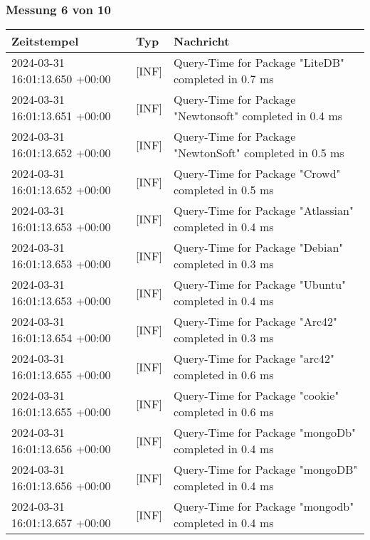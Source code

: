     \subsubsection*{Messung 6 von 10} \label{subsubsec:MySQLMitIndex6von10}
        {
            {\small
                \begin{tabularx}{\textwidth}{|l|l|X|}
                    \hline
                    \textbf{Zeitstempel} & \textbf{Typ} & \textbf{Nachricht} \\
                    \hline
                    \endhead
                    2024-03-31 16:01:13.650 +00:00 & [INF] & Query-Time for Package "LiteDB" completed in 0.7 ms \\
                    2024-03-31 16:01:13.651 +00:00 & [INF] & Query-Time for Package "Newtonsoft" completed in 0.4 ms \\
                    2024-03-31 16:01:13.652 +00:00 & [INF] & Query-Time for Package "NewtonSoft" completed in 0.5 ms \\
                    2024-03-31 16:01:13.652 +00:00 & [INF] & Query-Time for Package "Crowd" completed in 0.5 ms \\
                    2024-03-31 16:01:13.653 +00:00 & [INF] & Query-Time for Package "Atlassian" completed in 0.4 ms \\
                    2024-03-31 16:01:13.653 +00:00 & [INF] & Query-Time for Package "Debian" completed in 0.3 ms \\
                    2024-03-31 16:01:13.653 +00:00 & [INF] & Query-Time for Package "Ubuntu" completed in 0.4 ms \\
                    2024-03-31 16:01:13.654 +00:00 & [INF] & Query-Time for Package "Arc42" completed in 0.3 ms \\
                    2024-03-31 16:01:13.655 +00:00 & [INF] & Query-Time for Package "arc42" completed in 0.6 ms \\
                    2024-03-31 16:01:13.655 +00:00 & [INF] & Query-Time for Package "cookie" completed in 0.6 ms \\
                    2024-03-31 16:01:13.656 +00:00 & [INF] & Query-Time for Package "mongoDb" completed in 0.4 ms \\
                    2024-03-31 16:01:13.656 +00:00 & [INF] & Query-Time for Package "mongoDB" completed in 0.4 ms \\
                    2024-03-31 16:01:13.657 +00:00 & [INF] & Query-Time for Package "mongodb" completed in 0.4 ms \\

\end{tabularx}}}
